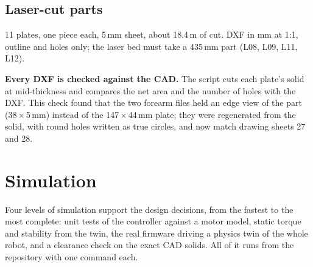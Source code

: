 \documentclass[11pt,a4paper]{article}
\begin{document}
\subsection{Laser-cut parts}
11 plates, one piece each, 5\,mm sheet, about 18.4\,m of cut. DXF in mm at 1:1, outline and holes only; the laser bed must take a 435\,mm part (L08, L09, L11, L12).

\textbf{Every DXF is checked against the CAD.} The script cuts each plate's solid at mid-thickness and compares the net area and the number of holes with the DXF. This check found that the two forearm files held an edge view of the part (38\,$\times$\,5\,mm) instead of the 147\,$\times$\,44\,mm plate; they were regenerated from the solid, with round holes written as true circles, and now match drawing sheets 27 and 28.

\clearpage
\section{Simulation}\label{sec:sim}
Four levels of simulation support the design decisions, from the fastest to the most complete: unit tests of the controller against a motor model, static torque and stability from the twin, the real firmware driving a physics twin of the whole robot, and a clearance check on the exact CAD solids. All of it runs from the repository with one command each.
\end{document}
